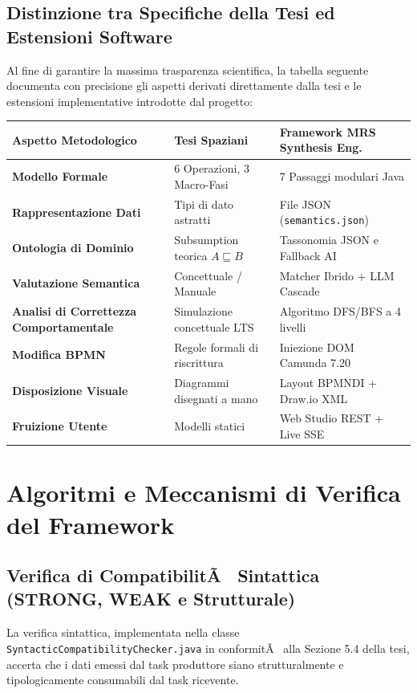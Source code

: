 ﻿\documentclass[11pt, a4paper]{report}
\begin{document}
\section{Distinzione tra Specifiche della Tesi ed Estensioni Software}

Al fine di garantire la massima trasparenza scientifica, la tabella seguente documenta con precisione gli aspetti derivati direttamente dalla tesi e le estensioni implementative introdotte dal progetto:

\begin{table}[h!]
\centering
\small
\renewcommand{\arraystretch}{1.3}
\begin{tabularx}{\textwidth}{>{\bfseries}l X X}
\toprule
\rowcolor{lightBg}
Aspetto Metodologico & Tesi Spaziani & Framework MRS Synthesis Eng. \\
\midrule
Modello Formale & 6 Operazioni, 3 Macro-Fasi & 7 Passaggi modulari Java \\
Rappresentazione Dati & Tipi di dato astratti & File JSON (\texttt{semantics.json}) \\
Ontologia di Dominio & Subsumption teorica $A \sqsubseteq B$ & Tassonomia JSON e Fallback AI \\
Valutazione Semantica & Concettuale / Manuale & Matcher Ibrido + LLM Cascade \\
Analisi di Correttezza Comportamentale & Simulazione concettuale LTS & Algoritmo DFS/BFS a 4 livelli \\
Modifica BPMN & Regole formali di riscrittura & Iniezione DOM Camunda 7.20 \\
Disposizione Visuale & Diagrammi disegnati a mano & Layout BPMNDI + Draw.io XML \\
Fruizione Utente & Modelli statici & Web Studio REST + Live SSE \\
\bottomrule
\end{tabularx}
\end{table}


\chapter{Algoritmi e Meccanismi di Verifica del Framework}

\section{Verifica di CompatibilitÃ  Sintattica (STRONG, WEAK e Strutturale)}

La verifica sintattica, implementata nella classe \texttt{SyntacticCompatibilityChecker.java} in conformitÃ  alla Sezione 5.4 della tesi, accerta che i dati emessi dal task produttore siano strutturalmente e tipologicamente consumabili dal task ricevente.
\end{document}
